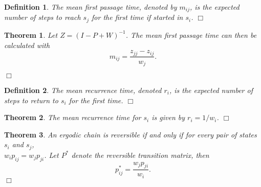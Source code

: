 \documentclass[11pt, letterpaper]{article}
\newenvironment{definition}
{\noindent\begin{defn}}
{\hfill $\Box$ \end{defn}}
\newtheorem{defn}{Definition}
\newenvironment{theorem}
{\noindent\begin{thm}}
{\hfill $\Box$ \end{thm}}
\newtheorem{thm}{Theorem}
\begin{document}
\begin{definition}
The \textit{mean first passage time}, denoted by $m_{ij}$, is the expected number of steps to reach $s_j$ for the first time if started in $s_i$.
\end{definition}

\begin{theorem}
Let $Z = (I-P+W)^{-1}$.  The mean first passage time can then be calculated with
\[
	m_{ij} = \frac{z_{jj} - z_{ij}}{w_j}.
\]

\end{theorem}

\begin{definition}
The \textit{mean recurrence time}, denoted $r_i$, is the expected number of steps to return to $s_i$ for the first time.
\end{definition}

\begin{theorem}
The mean recurrence time for $s_i$ is given by $r_i = 1/w_i$.
\end{theorem}

\begin{theorem}
An ergodic chain is reversible if and only if for every pair of states $s_i$ and $s_j$, \\
$w_i p_{ij} = w_j p_{ji}$.  Let $P^*$ denote the reversible transition matrix, then
\[
	p^*_{ij} = \frac{w_j p_{ji}}{w_i}.
\]
\end{theorem}
\end{document}
